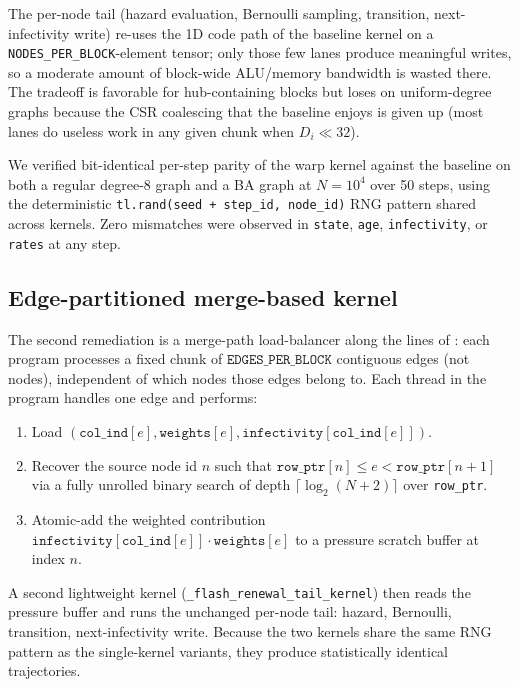 \documentclass[a4paper,fleqn]{cas-sc}
\theoremstyle{definition}
\theoremstyle{remark}
\begin{document}
The per-node tail (hazard evaluation, Bernoulli sampling, transition, next-infectivity write) re-uses the 1D code path of the baseline kernel on a \texttt{NODES\_PER\_BLOCK}-element tensor; only those few lanes produce meaningful writes, so a moderate amount of block-wide ALU/memory bandwidth is wasted there. The tradeoff is favorable for hub-containing blocks but loses on uniform-degree graphs because the CSR coalescing that the baseline enjoys is given up (most lanes do useless work in any given chunk when $D_i \ll 32$).

We verified bit-identical per-step parity of the warp kernel against the baseline on both a regular degree-8 graph and a BA graph at $N = 10^4$ over 50 steps, using the deterministic \texttt{tl.rand(seed + step\_id, node\_id)} RNG pattern shared across kernels. Zero mismatches were observed in \texttt{state}, \texttt{age}, \texttt{infectivity}, or \texttt{rates} at any step.

\subsection{Edge-partitioned merge-based kernel}
\label{app:merge_kernel}

The second remediation is a merge-path load-balancer along the lines of \citet{merrill2016merge}: each program processes a fixed chunk of $\texttt{EDGES\_PER\_BLOCK}$ contiguous edges (not nodes), independent of which nodes those edges belong to. Each thread in the program handles one edge and performs:
\begin{enumerate}
\item Load $(\texttt{col\_ind}[e], \texttt{weights}[e], \texttt{infectivity}[\texttt{col\_ind}[e]])$.
\item Recover the source node id $n$ such that $\texttt{row\_ptr}[n] \leq e < \texttt{row\_ptr}[n+1]$ via a fully unrolled binary search of depth $\lceil \log_2(N + 2)\rceil$ over \texttt{row\_ptr}.
\item Atomic-add the weighted contribution $\texttt{infectivity}[\texttt{col\_ind}[e]] \cdot \texttt{weights}[e]$ to a pressure scratch buffer at index $n$.
\end{enumerate}
A second lightweight kernel (\texttt{\_flash\_renewal\_tail\_kernel}) then reads the pressure buffer and runs the unchanged per-node tail: hazard, Bernoulli, transition, next-infectivity write. Because the two kernels share the same RNG pattern as the single-kernel variants, they produce statistically identical trajectories.
\end{document}
